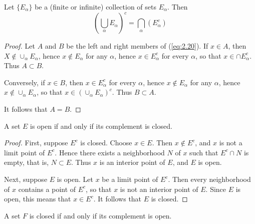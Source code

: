 \begin{thm}
    \label{thm:2.22}
    Let $\{E_\alpha\}$ be a (finite or infinite) collection of sets $E_\alpha$. Then
    \begin{equation}
        \label{eq:2.20}
        \left(\bigcup_{\alpha} E_{\alpha} \right)^c = \bigcap_{\alpha}( E_{\alpha}^c )
    \end{equation}
\end{thm}

\begin{proof}
    Let $A$ and $B$ be the left and right members of (\ref{eq:2.20}). 
    If $x \in A$, then $X \not\in \cup_\alpha E_\alpha$, 
    hence $x \not\in E_\alpha$ for any $\alpha$, 
    hence $x \in E_\alpha^c$ for every $\alpha$, 
    so that $x \in \cap E_\alpha^c$.
    Thus $A \subset B$.

    Conversely, if $x \in B$, then $x \in E_\alpha^c$ for every $\alpha$,
    hence $x \not\in E_\alpha$ for any $\alpha$,
    hence $x \not\in \cup_\alpha E_\alpha$, 
    so that $x \in (\cup_\alpha E_\alpha)^c$. 
    Thus $B \subset A$.

    It follows that $A = B$.
\end{proof}

\begin{thm}
    \label{thm:2.23}
    A set $E$ is open if and only if its complement is closed.
\end{thm}

\begin{proof}
    First, suppose $E^c$ is closed. Choose $x \in E$. Then $x \not\in E^c$, and $x$ is not a limit point of $E^c$. Hence there exists a neighborhood $N$ of $x$ such that $E^c \cap N$ is empty, that is, $N \subset E$. Thus $x$ is an interior point of $E$, and $E$ is open.
    
    Next, suppose $E$ is open. Let $x$ be a limit point of $E^c$. Then every neighborhood of $x$ contains a point of $E^c$, so that $x$ is not an interior point of $E$. Since $E$ is open, this means that $x \in E^c$. It follows that $E$ is closed.
\end{proof}

\begin{myCorollary*}
    A set $F$ is closed if and only if its complement is open.
\end{myCorollary*}


